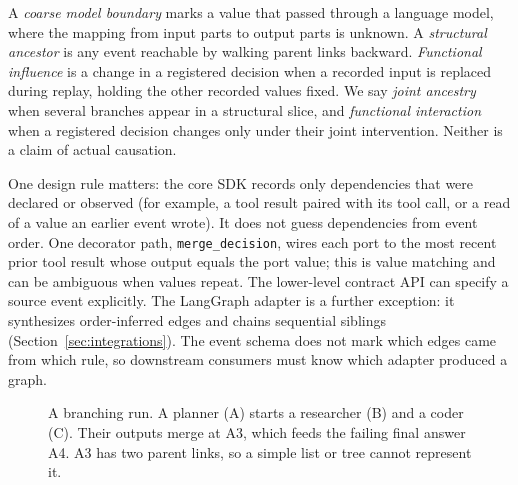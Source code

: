 \documentclass[11pt]{article}
\newcommand{\code}[1]{\textcolor{codegreen}{\texttt{#1}}}
\begin{document}
\vspace{1em}

A \emph{coarse model boundary} marks a value that passed through a language model, where the mapping from input parts to output parts is unknown. A \emph{structural ancestor} is any event reachable by walking parent links backward. \emph{Functional influence} is a change in a registered decision when a recorded input is replaced during replay, holding the other recorded values fixed. We say \emph{joint ancestry} when several branches appear in a structural slice, and \emph{functional interaction} when a registered decision changes only under their joint intervention. Neither is a claim of actual causation.

\vspace{1em}    

One design rule matters: the core SDK records only dependencies that were declared or observed (for example, a tool result paired with its tool call, or a read of a value an earlier event wrote). It does not guess dependencies from event order. One decorator path, \code{merge\_decision}, wires each port to the most recent prior tool result whose output equals the port value; this is value matching and can be ambiguous when values repeat. The lower-level contract API can specify a source event explicitly. The LangGraph adapter is a further exception: it synthesizes order-inferred edges and chains sequential siblings (Section~\ref{sec:integrations}). The event schema does not mark which edges came from which rule, so downstream consumers must know which adapter produced a graph.

\begin{figure}[t]
\centering
{}
\caption{A branching run. A planner (A) starts a researcher (B) and a coder (C). Their outputs merge at A3, which feeds the failing final answer A4. A3 has two parent links, so a simple list or tree cannot represent it.}
\label{fig:dag}
\end{figure}
\end{document}
